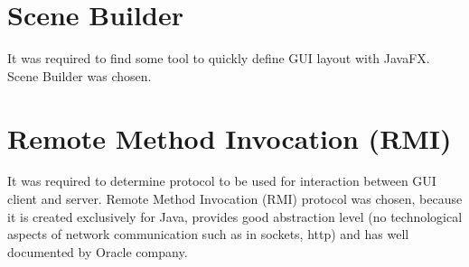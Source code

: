 \section{Scene Builder}
\label{sec:scenebuilder} 
It was required to find some tool to quickly define GUI layout with JavaFX.
Scene Builder was chosen.

\section{Remote Method Invocation (RMI)}
\label{sec:rmi}
It was required to determine protocol to be used for interaction between GUI
client and server. Remote Method Invocation (RMI) protocol was chosen, because
it is created exclusively for Java, provides good abstraction level (no
technological aspects of network communication such as in sockets, http) and has
well documented by Oracle company.
